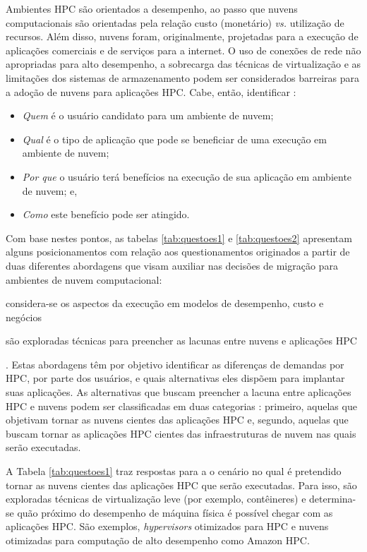 \documentclass[tese,capa]{texufpel}
\begin{document}
Ambientes HPC são orientados a desempenho, ao passo que nuvens computacionais são orientadas pela relação custo (monetário) \emph{vs.} utilização de recursos. Além disso, nuvens foram, originalmente, projetadas para a execução de aplicações comerciais e de serviços para a internet. O uso de conexões de rede não apropriadas para alto desempenho, a sobrecarga das técnicas de virtualização e as limitações dos sistemas de armazenamento podem ser considerados barreiras para a adoção de nuvens para aplicações HPC. Cabe, então, identificar \cite{guptaEvaluatingImprovingPerformance2016d}:

\begin{itemize}[noitemsep]
    \item \emph{Quem} é o usuário candidato para um ambiente de nuvem;
    \item \emph{Qual} é o tipo de aplicação que pode se beneficiar de uma execução em ambiente de nuvem;
    \item \emph{Por que} o usuário terá benefícios na execução de sua aplicação em ambiente de nuvem; e,
    \item \emph{Como} este benefício pode ser atingido.
\end{itemize}

Com base nestes pontos, as tabelas \ref{tab:questoes1} e \ref{tab:questoes2} apresentam alguns posicionamentos com relação aos questionamentos originados a partir de duas diferentes abordagens que visam auxiliar nas decisões de migração para ambientes de nuvem computacional: 
\begin{enumerate*}[label=\textit{\alph*}),itemjoin={{; }},itemjoin*={{; e }}]
  \item considera-se os aspectos da execução em modelos de desempenho, custo e negócios
  \item são exploradas técnicas para preencher as lacunas entre nuvens e aplicações HPC
\end{enumerate*}. Estas abordagens têm por objetivo identificar as diferenças de demandas por HPC, por parte dos usuários, e quais alternativas eles dispõem para implantar suas aplicações. As alternativas que buscam preencher a lacuna entre aplicações HPC e nuvens podem ser classificadas em duas categorias \cite{guptaEvaluatingImprovingPerformance2016d}: primeiro, aquelas que objetivam tornar as nuvens cientes das aplicações HPC e, segundo, aquelas que buscam tornar as aplicações HPC cientes das infraestruturas de nuvem nas quais serão executadas.

A Tabela \ref{tab:questoes1} traz respostas para a o cenário no qual é pretendido tornar as nuvens cientes das aplicações HPC que serão executadas. Para isso, são exploradas técnicas de virtualização leve (por exemplo, contêineres) e determina-se quão próximo do desempenho de máquina física é possível chegar com as aplicações HPC. São exemplos, \textit{hypervisors} otimizados para HPC e nuvens otimizadas para computação de alto desempenho como Amazon HPC.
\end{document}
